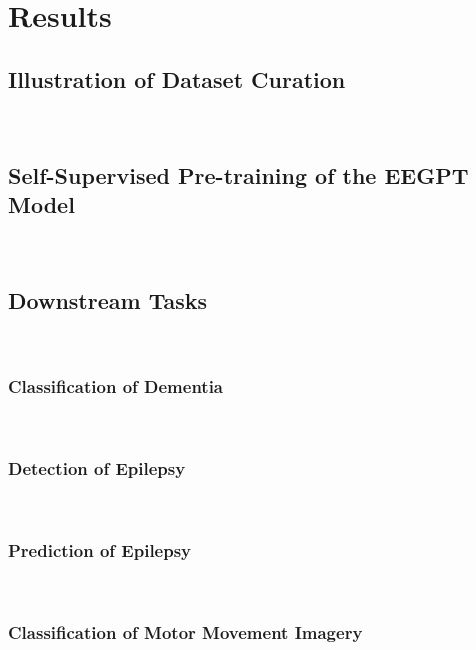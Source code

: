 \documentclass[final,3p,times,twocolumn]{elsarticle}
\begin{document}
\section{Results}
\subsection{Illustration of Dataset Curation}
\\
\indent
\subsection{Self-Supervised Pre-training of the EEGPT Model}
\\
\indent
\subsection{Downstream Tasks}
\\
\indent
\subsubsection{Classification of Dementia}
\indent
\\
\subsubsection{Detection of Epilepsy}
\\
\indent
\subsubsection{Prediction of Epilepsy}
\\
\indent
\subsubsection{Classification of Motor Movement Imagery}
\\
\indent
\label{sec:results}
\end{document}
